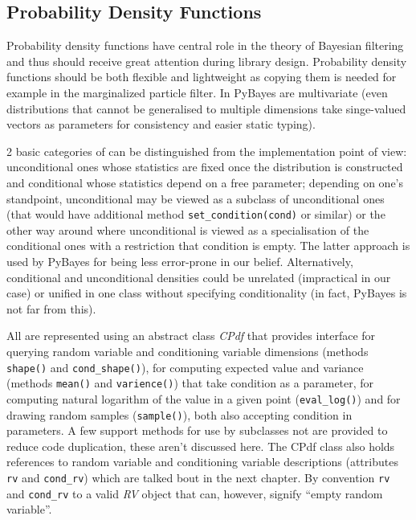 \subsection{Probability Density Functions}

Probability density functions have central role in the theory of Bayesian filtering and thus should
receive great attention during library design. Probability density functions should be both flexible
and lightweight as copying them is needed for example in the marginalized particle filter. In PyBayes
{\pdfs} are multivariate (even distributions that cannot be generalised to multiple dimensions take
singe-valued vectors as parameters for consistency and easier static typing).

2 basic categories of {\pdfs} can be distinguished from the implementation point of view:
unconditional ones whose statistics are fixed once the distribution is constructed and conditional
{\pdfs} whose statistics depend on a free parameter; depending on one's standpoint, unconditional
{\pdfs} may be viewed as a subclass of unconditional ones (that would have additional method
\verb|set_condition(cond)| or similar) or the other way around where unconditional {\pdf} is viewed
as a specialisation of the conditional ones with a restriction that condition is empty.
The latter approach is used by PyBayes for being less error-prone in our belief.
Alternatively, conditional and unconditional densities could be unrelated (impractical in our case)
or unified in one class without specifying conditionality (in fact, PyBayes is not far from this).

All {\pdfs} are represented using an abstract class \emph{CPdf} that provides interface for querying
random variable and conditioning variable dimensions (methods \verb|shape()| and \verb|cond_shape()|),
for computing expected value and variance (methods \verb|mean()| and \verb|varience()|) that take
condition as a parameter, for computing natural logarithm of the {\pdf} value in a given point
(\verb|eval_log()|) and for drawing random samples (\verb|sample()|), both also accepting condition
in parameters. A few support methods for use by subclasses not are provided to reduce code
duplication, these aren't discussed here. The CPdf class also holds references to random variable
and conditioning variable descriptions (attributes \verb|rv| and \verb|cond_rv|) which are talked 
bout in the next chapter. By convention \verb|rv| and \verb|cond_rv| to a valid \emph{RV} object
that can, however, signify ``empty random variable''.


